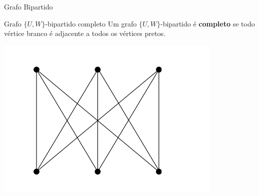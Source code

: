 \documentclass[xcolor=dvipsnames,table]{beamer}
\begin{document}
	\begin{frame}{Grafo Bipartido}
		\begin{block}{Grafo $\{ U, W \}$-bipartido completo}
			Um grafo $\{U, W \}$-bipartido é {\bf completo} se todo vértice branco é adjacente a todos os vértices pretos. 
		\end{block} \pause
		\begin{center}
			\includegraphics[width=.6\textwidth]{images/bipartido-completo.png}
		\end{center}
	\end{frame}
	
	\begin{frame}
		\titlepage
	\end{frame}
	
\end{document}
